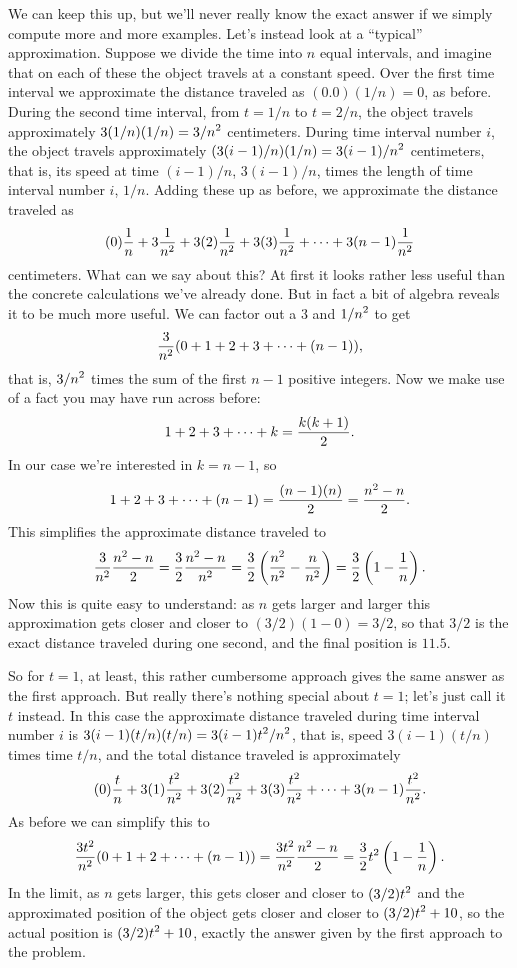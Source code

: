 We can keep this up, but we'll never really know the exact answer if
we simply compute more and more examples. Let's instead look at a
``typical'' approximation. Suppose we divide the time into $n$ equal
intervals, and imagine that on each of these the object travels at a
constant speed. Over the first time interval we approximate the
distance traveled as $(0.0)(1/n)=0$, as before. During the second time
interval, from $t=1/n$ to $t=2/n$, the object travels approximately
$\displaystyle 3(1/n)(1/n)=3/n^2$ centimeters. During time interval number $i$, the
object travels approximately $\displaystyle (3(i-1)/n)(1/n)=3(i-1)/n^2$
centimeters, that is, its speed at time $(i-1)/n$, $3(i-1)/n$, times
the length of time interval number $i$, $1/n$.
Adding these up as before, we approximate the distance traveled as
$$
  (0){1\over n}+3{1\over n^2}+3(2){1\over n^2}+
  3(3){1\over n^2}+\cdots+3(n-1){1\over n^2}
$$
centimeters. What can we say about this? At first it looks rather less
useful than the concrete calculations we've already done. But in fact
a bit of algebra reveals it to be much more useful. We can factor out
a 3 and $\displaystyle 1/n^2$ to get
$$
  {3\over n^2}(0+1+2+3+\cdots+(n-1)),
$$
that is, $\displaystyle 3/n^2$ times the sum of the first $n-1$ positive
integers. Now we make use of a fact you may have run across before:
$$
  1+2+3+\cdots+k={k(k+1)\over2}.
$$
In our case we're interested in $k=n-1$, so
$$
  1+2+3+\cdots+(n-1)={(n-1)(n)\over2}={n^2-n\over2}.
$$
This simplifies the approximate distance traveled to 
$$
  {3\over n^2}{n^2-n\over2}={3\over2}{n^2-n\over n^2}=
  {3\over2}\left({n^2\over n^2}-{n\over n^2}\right)=
  {3\over2}\left(1-{1\over n}\right).
$$
Now this is quite easy to understand: as $n$ gets larger and larger
this approximation gets closer and closer to $(3/2)(1-0)=3/2$, so that
$3/2$ is the exact distance traveled during one second, and the final
position is $11.5$.

So for $t=1$, at least, this rather cumbersome approach gives the same
answer as the first approach. But really there's nothing special about
$t=1$; let's just call it $t$ instead. In this case the approximate
distance traveled during time interval number $i$ is $\displaystyle
3(i-1)(t/n)(t/n)=3(i-1)t^2/n^2$, that is, speed $3(i-1)(t/n)$ times
time $t/n$, and the total distance traveled is approximately
$$
  (0){t\over n}+3(1){t^2\over n^2}+3(2){t^2\over n^2}+
  3(3){t^2\over n^2}+\cdots+3(n-1){t^2\over n^2}.
$$
As before we can simplify this to
$$
  {3t^2\over n^2}(0+1+2+\cdots+(n-1))={3t^2\over n^2}{n^2-n\over2}=
  {3\over2}t^2\left(1-{1\over n}\right).
$$ 
In the limit, as $n$ gets larger, this gets closer and closer to $\displaystyle
(3/2)t^2$ and the approximated position of the object gets closer and
closer to $\displaystyle (3/2)t^2+10$, so the actual position is $\displaystyle
(3/2)t^2+10$, exactly the answer given by the first approach to the
problem.
\endexample


